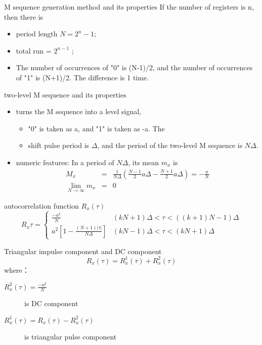 \begin{frame}{M sequence generation method and its properties}
If the number of registers is n, then there is
\begin{itemize}
\item period length $N=2^n-1$;
\item total run = $2^{n-1}$ ;
\item The number of occurrences of  "0" is (N-1)/2, and the number of occurrences of "1" is (N+1)/2. The difference is 1 time.
\end{itemize}
\end{frame}

\begin{frame}{two-level M sequence and its properties}
\begin{itemize}
\item turns the M sequence into a level signal,
\begin{itemize}
\item "0" is taken as a, and "1" is taken as -a.
The \item shift pulse period is $\Delta$, and the period of the two-level M sequence is $N\Delta$.
\end{itemize}
\item numeric features:
In a period of $N\Delta$, its mean $m_x$ is \\
\begin{eqnarray*}
M_x &=& \frac{1}{N\Delta}\left(\frac{N-1}{2}a\Delta-\frac{N+1}{2}a\Delta\right)=-\frac{a}{N} \\
\lim_{N\rightarrow \infty}m_x &=& 0
\end{eqnarray*}
\end{itemize}
\end{frame}

\begin{frame}{autocorrelation function $R_x(\tau)$}
$$
R_x{\tau}=\begin{cases}
\displaystyle \frac{-a^2}{N} & \scriptstyle (kN+1)\Delta<\tau<((k+1)N-1)\Delta  \\
\displaystyle a^2\left[ 1-\frac{(N+1)|\tau|}{N\Delta}\right] &\scriptstyle (kN-1)\Delta<\tau<(kN+1)\Delta
\end{cases}
$$
\end{frame}

\begin{frame}{Triangular impulse component and DC component}
$$
R_x(\tau)=R^1_x(\tau)+R^2_x(\tau)
$$
where：
\begin{description}
\item[$R_x^2(\tau)=\frac{-a^2}{N}$]is DC component
\item[$R_x^1(\tau)=R_x(\tau)-R^2_x(\tau)$]is triangular pulse component
\end{description}
\end{frame}

